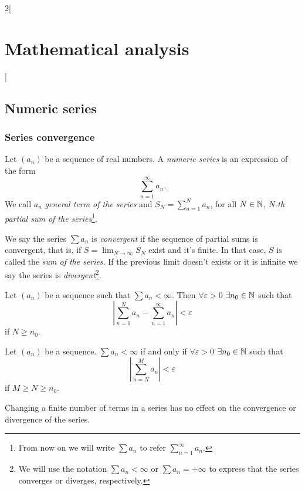 \documentclass[../../../main.tex]{subfiles}
\begin{document}
\begin{multicols}{2}[\section{Mathematical analysis}]
  \subsection{Numeric series}
  \subsubsection{Series convergence}
  \begin{definition}
    Let $(a_n)$ be a sequence of real numbers. A \textit{numeric series} is an expression of the form $$\sum_{n=1}^\infty a_n.$$ We call $a_n$ \textit{general term of the series} and $\displaystyle S_N=\sum_{n=1}^N a_n$, for all $N\in\mathbb{N} $, \textit{N-th partial sum of the series}\footnote{From now on we will write $\sum a_n$ to refer $\displaystyle\sum_{n=1}^\infty a_n$.}.
  \end{definition}
  \begin{definition}
    We say the series $\sum a_n$ is \textit{convergent} if the sequence of partial sums is convergent, that is, if $\displaystyle S=\lim_{N\to\infty}S_N$ exist and it's finite. In that case, $S$ is called the \textit{sum of the series}. If the previous limit doesn't exists or it is infinite we say the series is \textit{divergent}\footnote{We will use the notation $\sum a_n<\infty$ or $\sum a_n=+\infty$ to express that the series converges or diverges, respectively.}.
  \end{definition}
  \begin{prop}
    Let $(a_n)$ be a sequence such that $\sum a_n<\infty$. Then $\forall\varepsilon>0$ $\exists n_0\in\mathbb{N} $ such that $$\left|\sum_{n=1}^N a_n-\sum_{n=1}^\infty a_n\right|<\varepsilon$$ if $N\geq n_0$.
  \end{prop}
  \begin{theorem}
    Let $(a_n)$ be a sequence. $\sum a_n<\infty$ if and only if $\forall\varepsilon>0$ $\exists n_0\in\mathbb{N} $ such that $$\left|\sum_{n=N}^Ma_n\right|<\varepsilon$$ if $M\geq N\geq n_0$.
  \end{theorem}
  \begin{corollary}
    Changing a finite number of terms in a series has no effect on the convergence or divergence of the series.
  \end{corollary}
  \begin{corollary}

\end{corollary}
\end{multicols}
\end{document}
